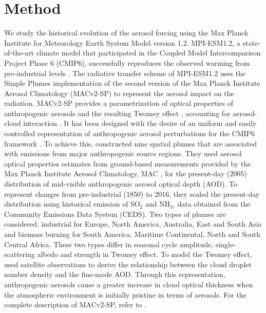 \documentclass[draft]{agujournal2019}
\begin{document}
\section{Method}\label{sec:method}
      We study the historical evolution of the aerosol forcing using the Max Planck Institute for Meteorology Earth System Model version 1.2. MPI-ESM1.2, a state-of-the-art climate model \cite{Mauritsen_2019} that participated in the Coupled Model Intercomparison Project Phase 6 (CMIP6), successfully reproduces the observed warming from pre-industrial levels \cite{Mauritsen_2020}.
      The radiative transfer scheme of MPI-ESM1.2 uses the Simple Plumes implementation of the second version of the Max Planck Institute Aerosol Climatology (MACv2-SP) to represent the aerosol impact on the radiation. MACv2-SP provides a parametrization of optical properties of anthropogenic aerosols and the resulting Twomey effect \cite{Twomey_1974}, accounting for aerosol-cloud interaction \cite{Stevens_2017}. It has been designed with the desire of an uniform and easily controlled representation of anthropogenic aerosol perturbations for the CMIP6 framework \cite{Eyring_2016,Pincus_2016}. To achieve this,  constructed nine spatial plumes that are associated with emissions from major anthropogenic source regions. They used aerosol optical properties estimates from ground-based measurements provided by the Max Planck Institute Aerosol Climatology, MAC \cite{Kinne_2013}, for the present-day (2005) distribution of mid-visible anthropogenic aerosol optical depth (AOD). 
      To represent changes from pre-industrial (1850) to 2016, they scaled the present-day distribution using historical emission of SO$_2$ and NH$_3$, data obtained from the Community Emissions Data System (CEDS). Two types of plumes are considered: industrial for Europe, North America, Australia, East and South Asia and biomass burning for South America, Maritime Continental, North and South Central Africa. These two types differ in seasonal cycle amplitude, single-scattering albedo and strength in Twomey effect. 
      To model the Twomey effect,  used satellite observations to derive the relationship between the cloud droplet number density and the fine-mode AOD. Through this representation, anthropogenic aerosols cause a greater increase in cloud optical thickness when the atmospheric environment is initially pristine in terms of aerosols. For the complete description of MACv2-SP, refer to .
\end{document}
